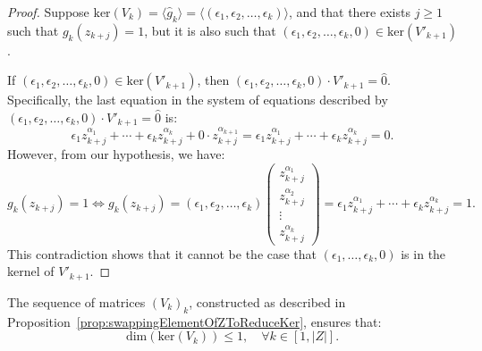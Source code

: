 \documentclass[11pt]{llncs}
\begin{document}
\begin{proof}
	
	    Suppose \( \text{ker}(V_k) = \langle \hat{g}_k \rangle = \langle (\epsilon_1, \epsilon_2, \dots, \epsilon_k) \rangle \), and that there exists \( j \geq 1 \) such that \( g_k(z_{k+j}) = 1 \), but it is also such that \( (\epsilon_1, \epsilon_2, \dots, \epsilon_k, 0) \in \text{ker}(V'_{k+1}) \).

  
If \( (\epsilon_1, \epsilon_2, \dots, \epsilon_k, 0) \in \text{ker}(V'_{k+1}) \), then \( (\epsilon_1, \epsilon_2, \dots, \epsilon_k, 0) \cdot V'_{k+1} = \hat{0} \). Specifically, the last equation in the system of equations described by \( (\epsilon_1, \epsilon_2, \dots, \epsilon_k, 0) \cdot V'_{k+1} = \hat{0} \) is:
   \[
\epsilon_1 z_{k+j}^{\alpha_1} + \cdots + \epsilon_k z_{k+j}^{\alpha_k} + 0 \cdot z_{k+j}^{\alpha_{k+1}} = \epsilon_1 z_{k+j}^{\alpha_1} + \cdots + \epsilon_k z_{k+j}^{\alpha_k} = 0.
\]
However, from our hypothesis, we have:
\[
g_k(z_{k+j}) = 1 \iff g_k(z_{k+j}) = 
(\epsilon_1, \epsilon_2, \dots, \epsilon_k)
\begin{pmatrix}
z_{k+j}^{\alpha_1} \\
z_{k+j}^{\alpha_2} \\
\vdots \\
z_{k+j}^{\alpha_k}
\end{pmatrix}
= \epsilon_1 z_{k+j}^{\alpha_1} + \cdots + \epsilon_k z_{k+j}^{\alpha_k} = 1.
\]
This contradiction shows that it cannot be the case that \( (\epsilon_1, \dots, \epsilon_k, 0) \) is in the kernel of \( V'_{k+1} \).   

\end{proof}

\begin{proposition}\label{prop:upperBoundOnRightKernel}
    The sequence of matrices \( (V_k)_k \), constructed as described in Proposition~\ref{prop:swappingElementOfZToReduceKer}, ensures that:    
    \[
    \text{dim}\left(\text{ker}\left(V_k\right)\right) \leq 1, \quad \forall k \in [1, |Z|].
    \]
\end{proposition}
\end{document}
